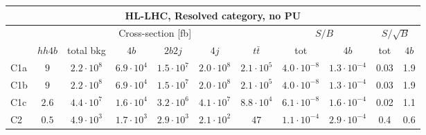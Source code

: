 \begin{tabular}{|l|cc|cccc|cc|cc|}
  \hline
\multicolumn{11}{|c|}{HL-LHC, Resolved category, no PU}\\
\hline
&  \multicolumn{6}{c|}{Cross-section [fb]} &  \multicolumn{2}{c|}{$S/B$}  &  \multicolumn{2}{c|}{$S/\sqrt{B}$}  \\
   &  $hh4b$ &  total bkg  &   $4b$    &  $2b2j$   &   $4j$    &
$t\bar{t}$ &
tot & $4b$ & tot & $4b$ \\
  \hline
  \hline
 C1a   & $9$  &   $2.2\cdot 10^8$   & $6.9\cdot 10^4$ & $1.5\cdot 10^7$ & $2.0\cdot 10^8$ & $2.1\cdot 10^5$ &  $4.0\cdot 10^{-8}$  &  $1.3\cdot 10^{-4}$  &  0.03   & 1.9         \\
 C1b   & $9$  &   $2.2\cdot 10^8$   & $6.9\cdot 10^4$ & $1.5\cdot 10^7$ & $2.0\cdot 10^8$ & $2.1\cdot 10^5$ &  $4.0\cdot 10^{-8}$  & $1.3\cdot 10^{-4}$   &  0.03   & 1.9         \\
 C1c   & $2.6$  &   $4.4\cdot 10^7$   & $1.6\cdot 10^4$ & $3.2\cdot 10^6$ & $4.1\cdot 10^7$ & $8.8\cdot 10^4$ &   $6.1\cdot 10^{-8}$  &  $1.6\cdot 10^{-4}$   &   0.02   & 1.1         \\
 C2    & $0.5$  &   $4.9\cdot 10^3$   & $1.7\cdot 10^3$ & $2.9\cdot 10^3$ & $2.1\cdot 10^2$ & $47$ &            $ 1.1\cdot 10^{-4}$   & $2.9\cdot 10^{-4}$   &   0.4   & 0.6       \\
\hline
\end{tabular}
